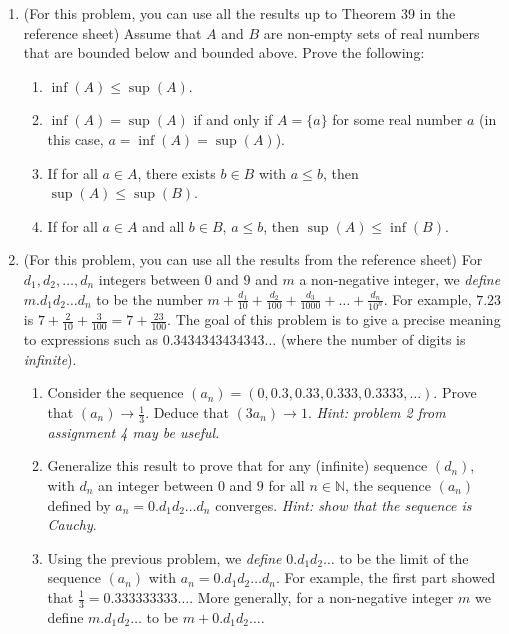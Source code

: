 \documentclass{amsart}
\theoremstyle{definition}
\begin{document}
\begin{enumerate}
\item (For this problem, you can use all the results up to Theorem 39 in the reference sheet) Assume that $A$ and $B$ are non-empty sets of real numbers that are bounded below and bounded above. Prove the following:

  \begin{enumerate}
  \item $\inf (A) \le \sup (A)$.
  \item $\inf (A) = \sup (A)$ if and only if $A = \{a\}$ for some real number $a$ (in this case, $a = \inf (A) = \sup (A)$).
  \item If for all $a \in A$, there exists $b \in B$ with $a \le b$, then $\sup (A) \le \sup (B)$.
  \item If for all $a \in A$ and all $b \in B$, $a \le b$, then $\sup (A) \le \inf (B)$.
  \end{enumerate}  
\item (For this problem, you can use all the results from the reference sheet) For $d_1, d_2, \ldots, d_n$ integers between $0$ and $9$ and $m$ a non-negative integer, we \emph{define} $m.d_1d_2 \ldots d_n$ to be the number $m + \frac{d_1}{10} + \frac{d_2}{100} + \frac{d_3}{1000} + \ldots + \frac{d_n}{10^n}$. For example, $7.23$ is $7 + \frac{2}{10} + \frac{3}{100} = 7 + \frac{23}{100}$. The goal of this problem is to give a precise meaning to expressions such as $0.3434343434343\ldots$ (where the number of digits is \emph{infinite}).

  \begin{enumerate}
  \item Consider the sequence $(a_n) = (0, 0.3, 0.33, 0.333, 0.3333, \ldots)$. Prove that $(a_n) \to \frac{1}{3}$. Deduce that $(3 a_n) \to 1$. \emph{Hint: problem 2 from assignment 4 may be useful.}
  \item Generalize this result to prove that for any (infinite) sequence $(d_n)$, with $d_n$ an integer between $0$ and $9$ for all $n \in \mathbb{N}$, the sequence $(a_n)$ defined by $a_n = 0.d_1d_2 \ldots d_n$ converges. \emph{Hint: show that the sequence is Cauchy}.
  \item Using the previous problem, we \emph{define} $0.d_1d_2 \ldots$ to be the limit of the sequence $(a_n)$ with $a_n = 0.d_1 d_2 \ldots d_n$. For example, the first part showed that $\frac{1}{3} = 0.333333333\ldots$. More generally, for a non-negative integer $m$ we define $m.d_1 d_2 \ldots$ to be $m + 0.d_1 d_2 \ldots$.


\end{enumerate}
\end{enumerate}
\end{document}
